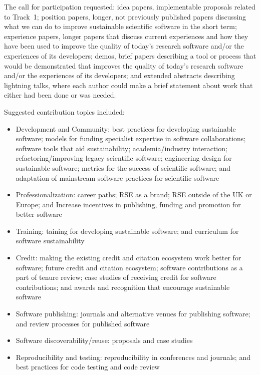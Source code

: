 \documentclass[11pt, oneside]{amsart}
\begin{document}
The call for participation requested:
idea papers, implementable proposals related to Track~1;
position papers, longer, not previously published papers
discussing what we can do to improve sustainable scientific
software in the short term;
experience papers, longer papers that discuss current
experiences and how they have been used to improve the quality of
today's research software and/or the experiences of its developers;
demos, brief papers describing a tool or
process that would be demonstrated that improves the quality of today's research
software and\slash or the experiences of its developers; and
extended abstracts describing lightning talks,
where each author could make a brief statement about work that either had been
done or was needed.

Suggested contribution topics included:

\begin{itemize}
\renewcommand{\labelenumi}{\textbf{\theenumi}.}
\setlength{\rightmargin}{1em}

\item Development and Community:
best practices for developing sustainable software;
models for funding specialist expertise in software collaborations;
software tools that aid sustainability;
academia/industry interaction;
refactoring/improving legacy scientific software;
engineering design for sustainable software;
metrics for the success of scientific software; and
adaptation of mainstream software practices for scientific software

\item Professionalization:
career paths;
RSE as a brand;
RSE outside of the UK or Europe; and
Increase incentives in publishing, funding and promotion for better software

\item Training:
taining for developing sustainable software; and 
curriculum for software sustainability

\item Credit:
making the existing credit and citation ecosystem work better for software;
future credit and citation ecosystem;
software contributions as a part of tenure review;
case studies of receiving credit for software contributions; and
awards and recognition that encourage sustainable software

\item Software publishing:
journals and alternative venues for publishing software; and
review processes for published software

\item Software discoverability/reuse:
proposals and case studies

\item Reproducibility and testing:
reproducibility in conferences and journals; and
best practices for code testing and code review

\end{itemize}
\end{document}
